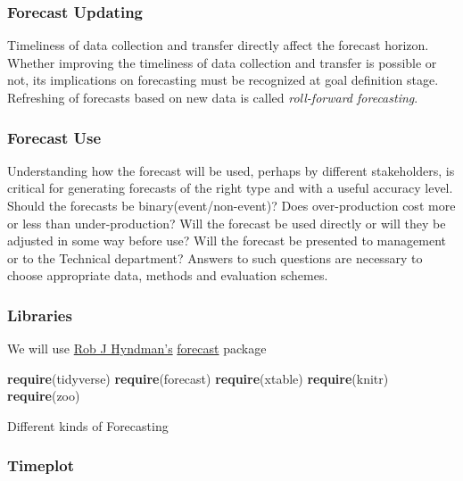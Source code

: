 \documentclass[]{article}
\newenvironment{Shaded}{\begin{snugshade}}{\end{snugshade}}
\newcommand{\KeywordTok}[1]{\textcolor[rgb]{0.13,0.29,0.53}{\textbf{#1}}}
\newcommand{\NormalTok}[1]{#1}
\begin{document}
\subsubsection{Forecast Updating}\label{forecast-updating}

Timeliness of data collection and transfer directly affect the forecast
horizon. Whether improving the timeliness of data collection and
transfer is possible or not, its implications on forecasting must be
recognized at goal definition stage. Refreshing of forecasts based on
new data is called \emph{roll-forward forecasting}.

\subsubsection{Forecast Use}\label{forecast-use}

Understanding how the forecast will be used, perhaps by different
stakeholders, is critical for generating forecasts of the right type and
with a useful accuracy level. Should the forecasts be
binary(event/non-event)? Does over-production cost more or less than
under-production? Will the forecast be used directly or will they be
adjusted in some way before use? Will the forecast be presented to
management or to the Technical department? Answers to such questions are
necessary to choose appropriate data, methods and evaluation schemes.

\subsubsection{Libraries}\label{libraries}

We will use \href{https://robjhyndman.com/about/}{Rob J Hyndman's}
\href{https://www.rdocumentation.org/packages/forecast/versions/8.3}{forecast}
package

\begin{Shaded}
\begin{Highlighting}[]
\KeywordTok{require}\NormalTok{(tidyverse) }
\KeywordTok{require}\NormalTok{(forecast)}
\KeywordTok{require}\NormalTok{(xtable)}
\KeywordTok{require}\NormalTok{(knitr)}
\KeywordTok{require}\NormalTok{(zoo)}
\end{Highlighting}
\end{Shaded}

Different kinds of Forecasting

\subsubsection{Timeplot}\label{timeplot}
\end{document}
